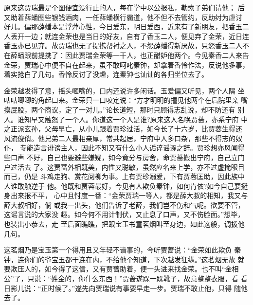 原来这贾瑞最是个图便宜没行止的人，每在学中以公报私，勒索子弟们请他；
后又助着薛蟠图些银钱酒肉，一任薛蟠横行霸道，他不但不去管约，反助纣为虐讨
好儿。偏那薛蟠本是浮萍心性，今日爱东，明日爱西，近来有了新朋友，把香玉二
人丢开一边；就连金荣也是当日的好友，自有了香玉二人，便见弃了金荣，近日连
香玉亦已见弃。故贾瑞也无了提携帮衬之人，不怨薛蟠得新厌故，只怨香玉二人不
在薛蟠跟前提携了：因此贾瑞金荣等一干人，也正醋妒他两个。今见秦香二人来告
金荣，贾瑞心中便不自在起来，虽不敢呵叱秦钟，却拿着香怜作法，反说他多事，
着实抢白了几句。香怜反讨了没趣，连秦钟也讪讪的各归坐位去了。

金荣越发得了意，摇头咂嘴的，口内还说许多闲话。玉爱偏又听见，两个人隔
坐咕咕唧唧的角起口来。金荣只一口咬定说：“方才明明的撞见他两个在后院里亲
嘴摸屁股，两个商议，定了一对儿。”论长道短，那时只顾得志乱说，却不防还有
别人。谁知早又触怒了一个人。你道这一个人是谁?原来这人名唤贾蔷，亦系宁府
中之正派玄孙，父母早亡，从小儿跟着贾珍过活，如今长了十六岁，比贾蓉生得还
风流俊俏。他兄弟二人最相亲厚，常共起居，宁府中人多口杂，那些不得志的奴仆，
专能造言诽谤主人，因此不知又有什么小人诟谇谣诼之辞。贾珍想亦风闻得些口声
不好，自己也要避些嫌疑，如今竟分与房舍，命贾蔷搬出宁府，自己立门户过活去
了。这贾蔷外相既美，内性又聪敏，虽然应名来上学，亦不过虚掩眼目而已，仍是
斗鸡走狗、赏花阅柳为事。上有贾珍溺爱，下有贾蓉匡助，因此族中人谁敢触逆于
他。他既和贾蓉最好，今见有人欺负秦钟，如何肯依?如今自己要挺身出来报不平，
心中且忖度一番：“金荣贾瑞一等人，都是薛大叔的相知，我又与薛大叔相好，倘
或我一出头，他们告诉了老薛，我们岂不伤和气呢。欲要不管，这谣言说的大家没
趣。如今何不用计制伏，又止息了口声，又不伤脸面。”想毕，也装出小恭去，走
至后面瞧瞧，把跟宝玉书童茗烟叫至身边，如此这般，调拨他几句。

这茗烟乃是宝玉第一个得用且又年轻不谙事的，今听贾蔷说：“金荣如此欺负
秦钟，连你们的爷宝玉都干连在内，不给他个知道，下次越发狂纵。”这茗烟无故
就要欺压人的，如今得了这信，又有贾蔷助着，便一头进来找金荣。也不叫“金相
公”了，只说：“姓金的，你什么东西！”贾蔷遂跺一跺靴子，故意整整衣服，看
看日影儿说：“正时候了。”遂先向贾瑞说有事要早走一步。贾瑞不敢止他，只得
随他去了。

